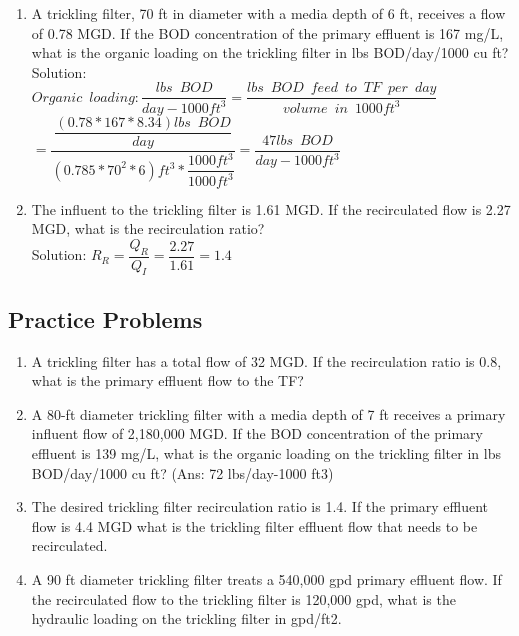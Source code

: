 \begin{enumerate}
\item A trickling filter, 70 ft in diameter with a media depth of 6 ft, receives a flow of 0.78 MGD. If the BOD concentration of the primary effluent is 167 mg/L, what is the organic loading on the trickling filter in lbs BOD/day/1000 cu ft?\\
Solution:\\
$Organic \enspace loading:\dfrac{lbs \enspace BOD}{day-1000ft^3}=\dfrac{lbs \enspace BOD \enspace feed \enspace to \enspace TF \enspace per \enspace day}{volume \enspace in \enspace 1000ft^3}$\\
$=\dfrac{\dfrac{(0.78*167*8.34)lbs \enspace BOD}{day}}{(0.785*70^2*6)ft^3*\dfrac{1000ft^3}{1000ft^3}}=\boxed{\dfrac{47 lbs \enspace BOD}{day-1000 ft^3}}$

\item The influent to the trickling filter is 1.61 MGD. If the recirculated flow is 2.27 MGD, what is the recirculation ratio?\\
Solution:  $R_R=\dfrac{Q_R}{Q_I}=\dfrac{2.27}{1.61}=\boxed{1.4}$\\
\end{enumerate}

\subsection{Practice Problems} 

\begin{enumerate}

\item A trickling filter has a total flow of 32 MGD.  If the recirculation ratio is 0.8, what is the primary effluent flow to the TF?\\


\item A 80-ft diameter trickling filter with a media depth of 7 ft receives a primary influent flow of 2,180,000 MGD. If the BOD concentration of the primary effluent is 139 mg/L, what is the organic loading on the trickling filter in lbs BOD/day/1000 cu ft? (Ans: 72 lbs/day-1000 ft3)\\

\item The desired trickling filter recirculation ratio is 1.4.  If the primary effluent flow is 4.4 MGD what is the trickling filter effluent flow that needs to be recirculated.\\

\item A 90 ft diameter trickling filter treats a 540,000 gpd primary effluent flow. If the recirculated flow to the trickling filter is 120,000 gpd, what is the hydraulic loading on the trickling filter in gpd/ft2.\\

\end{enumerate}


